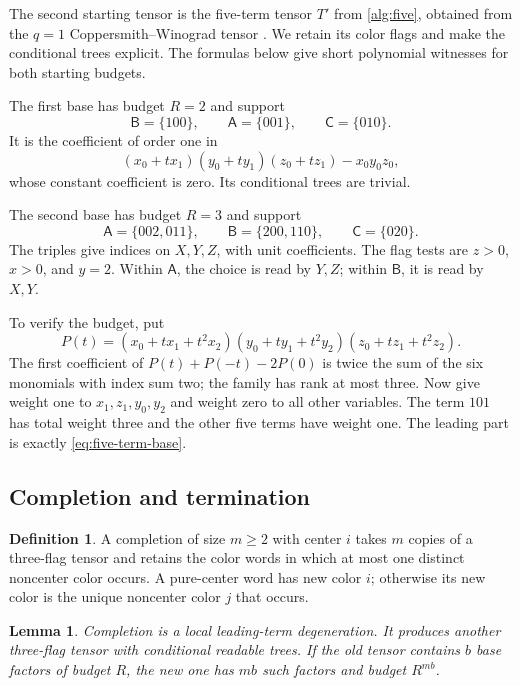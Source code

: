 \documentclass[11pt]{article}
\numberwithin{equation}{section}
\newtheorem{lemma}[theorem]{Lemma}
\theoremstyle{definition}
\newtheorem{definition}[theorem]{Definition}
\theoremstyle{remark}
\newcommand{\colA}{\mathsf A}
\newcommand{\colB}{\mathsf B}
\newcommand{\colC}{\mathsf C}
\begin{document}
The second starting tensor is the five-term tensor \(T'\) from
\eqref{alg:five}, obtained from the \(q=1\) Coppersmith--Winograd
tensor \cite[Section~7]{cw}.  We retain its color flags and make the
conditional trees explicit.  The formulas below give short polynomial
witnesses for both starting budgets.

The first base has budget \(R=2\) and support
\[
 \colB=\{100\},\qquad \colA=\{001\},\qquad \colC=\{010\}.
\]
It is the coefficient of order one in
\[
 (x_0+t x_1)(y_0+t y_1)(z_0+t z_1)-x_0y_0z_0,
\]
whose constant coefficient is zero.
Its conditional trees are trivial.

The second base has budget \(R=3\) and support
\begin{equation}\label{eq:five-term-base}
 \colA=\{002,011\},\qquad
 \colB=\{200,110\},\qquad
 \colC=\{020\}.
\end{equation}
The triples give indices on \(X,Y,Z\), with unit coefficients.
The flag tests are \(z>0\), \(x>0\), and \(y=2\).
Within \(\colA\), the choice is read by \(Y,Z\); within \(\colB\),
it is read by \(X,Y\).

To verify the budget, put
\[
 P(t)=(x_0+t x_1+t^2x_2)
      (y_0+t y_1+t^2y_2)
      (z_0+t z_1+t^2z_2).
\]
The first coefficient of
\(P(t)+P(-t)-2P(0)\) is twice the sum of the six monomials with
index sum two; the family has rank at most three.
Now give weight one to \(x_1,z_1,y_0,y_2\) and weight zero to all
other variables.
The term \(101\) has total weight three and the other five terms
have weight one.
The leading part is exactly \eqref{eq:five-term-base}.

\subsection{Completion and termination}

\begin{definition}\label{def:completion}
A completion of size \(m\ge2\) with center \(i\) takes \(m\) copies
of a three-flag tensor and retains the color words in which at most
one distinct noncenter color occurs.
A pure-center word has new color \(i\); otherwise its new color is
the unique noncenter color \(j\) that occurs.
\end{definition}

\begin{lemma}\label{lem:completion}
Completion is a local leading-term degeneration.
It produces another three-flag tensor with conditional readable trees.
If the old tensor contains \(b\) base factors of budget \(R\), the new
one has \(mb\) such factors and budget \(R^{mb}\).
\end{lemma}
\end{document}
